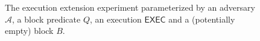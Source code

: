 \begin{figure}[t]
\begin{algorithm}[H]
    \caption{\label{alg.extension} The execution extension experiment
             parameterized by an adversary $\mathcal{A}$, a block predicate $Q$,
             an execution $\textsf{EXEC}$ and a (potentially empty) block $B$.}
    \begin{algorithmic}[1]
              \State\Return{$\bot$}
            \EndIf
              \State\Return{$\bot$}
            \EndIf
                \State\Return{$\bot$}
              \EndIf
            \Else
                \State\Return{$\bot$}
              \EndIf
                \State\Return{$\bot $}
              \EndIf
            \EndIf
            \State{}
        \EndFunction
        \vskip8pt
    \end{algorithmic}
\end{algorithm}
\end{figure}

